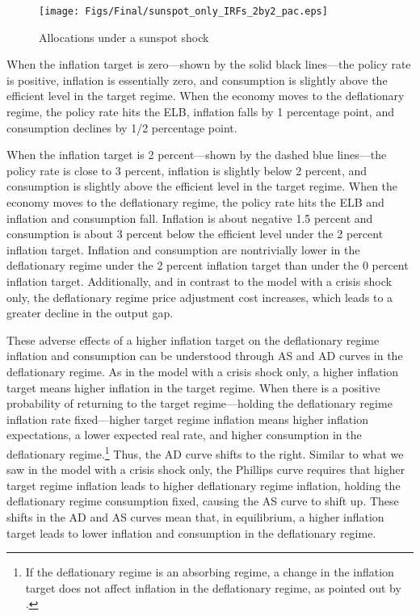 \documentclass[11pt]{article}
\begin{document}
	\begin{figure}[!h]
		\begin{center}
			\caption{Allocations under a sunspot shock\label{fig:IRFs_Deflationary}}
			\texttt{[image: Figs/Final/sunspot\_only\_IRFs\_2by2\_pac.eps]}\\
		\end{center}
	\end{figure}

	When the inflation target is zero---shown by the solid black lines---the policy rate is positive, inflation is essentially zero, and consumption is slightly above the efficient level in the target regime. When the economy moves to the deflationary regime, the policy rate hits the ELB, inflation falls by 1 percentage point, and consumption declines by 1/2 percentage point.

	When the inflation target is 2 percent---shown by the dashed blue lines---the policy rate is close to 3 percent, inflation is slightly below 2 percent, and consumption is slightly above the efficient level in the target regime. When the economy moves to the deflationary regime, the policy rate hits the ELB and inflation and consumption fall. Inflation is about negative 1.5 percent and consumption is about 3 percent below the efficient level under the 2 percent inflation target. Inflation and consumption are nontrivially lower in the deflationary regime under the 2 percent inflation target than under the 0 percent inflation target. Additionally, and in contrast to the model with a crisis shock only, the deflationary regime price adjustment cost increases, which leads to a greater decline in the output gap.

	These adverse effects of a higher inflation target on the deflationary regime inflation and consumption can be understood through AS and AD curves in the deflationary regime. As in the model with a crisis shock only, a higher inflation target means higher inflation in the target regime. When there is a positive probability of returning to the target regime---holding the deflationary regime inflation rate fixed---higher target regime inflation means higher inflation expectations, a lower expected real rate, and higher consumption in the deflationary regime.\footnote{If the deflationary regime is an absorbing regime, a change in the inflation target does not affect inflation in the deflationary regime, as pointed out by \citet{CubaBordaSingh2018}.} Thus, the AD curve shifts to the right. Similar to what we saw in the model with a crisis shock only, the Phillips curve requires that higher target regime inflation leads to higher deflationary regime inflation, holding the deflationary regime consumption fixed, causing the AS curve to shift up. These shifts in the AD and AS curves mean that, in equilibrium, a higher inflation target leads to lower inflation and consumption in the deflationary regime.
\end{document}
